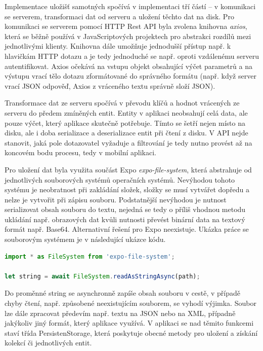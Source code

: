 Implementace uložišť samotných spočívá v implementaci tří částí -- v komunikaci se serverem, transformaci dat od serveru a uložení těchto dat na disk. Pro komunikaci se serverem pomocí HTTP Rest API byla zvolena knihovna \emph{axios}, která se běžně používá v JavaScriptových projektech pro abstrakci rozdílů mezi jednotlivými klienty. Knihovna dále umožňuje jednodušší přístup např. k hlavičkám HTTP dotazu a je tedy jednoduché se např. oproti vzdálenému serveru autentifikovat. Axios očekává na vstupu objekt obsahující výčet parametrů a na výstupu vrací tělo dotazu zformátované do správného formátu (např. když server vrací JSON odpověď, Axios z vráceného textu správně složí JSON).

Transformace dat ze serveru spočívá v převodu klíčů a hodnot vrácených ze serveru do předem zmíněných entit. Entity v aplikaci neobsahují celá data, ale pouze výčet, který aplikace skutečně potřebuje. Tímto se šetří nejen místo na disku, ale i doba serializace a deserializace entit při čtení z disku. V API nejde stanovit, jaká pole dotazovatel vyžaduje a filtrování je tedy nutno provést až na koncovém bodu procesu, tedy v mobilní aplikaci.

Pro uložení dat byla využita součást Expo \emph{expo-file-system}, která abstrahuje od jednotlivých souborových systémů operačních systémů. Nevýhodou tohoto systému je neobratnost při zakládání složek, složky se musí vytvářet dopředu a nelze je vytvořit při zápisu souboru. Podstatnější nevýhodou je nutnost serializovat obsah souboru do textu, nejedná se tedy o příliš vhodnou metodu ukládání např. obrazových dat kvůli nutnosti převést binární data na textový formát např. Base64. Alternativní řešení pro Expo neexistuje. Ukázka práce se souborovým systémem je v následující ukázce kódu.

\begin{lstlisting}[language=JavaScript, caption=Ukázka entity]
import * as FileSystem from 'expo-file-system';

let string = await FileSystem.readAsStringAsync(path);
\end{lstlisting}

Do proměnné string se asynchronně zapíše obsah souboru v cestě, v případě chyby čtení, např. způsobené neexistujícím souborem, se vyhodí výjimka. Soubor lze dále zpracovat předevím např. textu na JSON nebo na XML, případně jakýkoliv jiný formát, který aplikace využívá. V aplikaci se nad těmito funkcemi staví třída PersistenStorage, která poskytuje obecné metody pro uložení a získání kolekcí či jednotlivých entit.

